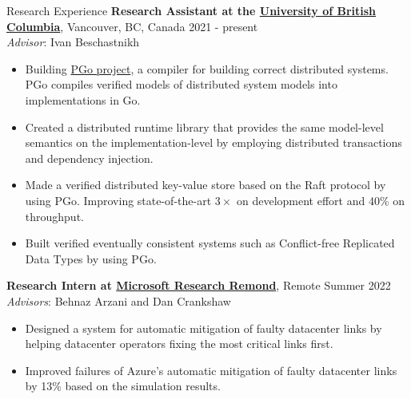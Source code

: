 \documentclass{resume} %
\begin{document}
\begin{rSection}{Research Experience}
	{\bf Research Assistant at the \href{https://www.ubc.ca/}{University of British Columbia}},
    {Vancouver, BC, Canada \hfill 2021 - present}
    \\\textit{Advisor}: Ivan Beschastnikh \smallskip
	\vspace{-0.5em}
	\begin{itemize}[leftmargin=3mm]
		\setlength{\itemsep}{1pt}
		\setlength{\parskip}{0pt}
		\setlength{\parsep}{0pt}
		\renewcommand\labelitemi{$\cdot$}

    \item Building \href{https://github.com/DistCompiler/pgo}{PGo project}, a compiler for building correct distributed
      systems. PGo compiles verified models of distributed system models into
      implementations in Go.
    \item Created a distributed runtime library that provides the same model-level
      semantics on the implementation-level by employing distributed
      transactions and dependency injection.
    \item Made a verified distributed key-value store based on the Raft protocol
      by using PGo. Improving state-of-the-art $3\times$ on development effort and
      40\% on throughput.
	\item Built verified eventually consistent systems such as Conflict-free Replicated 
		Data Types by using PGo.
	\end{itemize}

  {\bf Research Intern at \href{https://www.microsoft.com/en-us/research/lab/microsoft-research-redmond/}{Microsoft Research Remond}},
    {Remote \hfill Summer 2022}
    \\\textit{Advisors}: Behnaz Arzani and Dan Crankshaw \smallskip
	\vspace{-0.5em}
	\begin{itemize}[leftmargin=3mm]
		\setlength{\itemsep}{1pt}
		\setlength{\parskip}{0pt}
		\setlength{\parsep}{0pt}
		\renewcommand\labelitemi{$\cdot$}

    \item Designed a system for automatic mitigation of faulty datacenter links
      by helping datacenter operators fixing the most critical links first.
    \item Improved failures of Azure's automatic mitigation of faulty datacenter links by 13\% based
      on the simulation results.
  \end{itemize}


\end{rSection}
\end{document}
